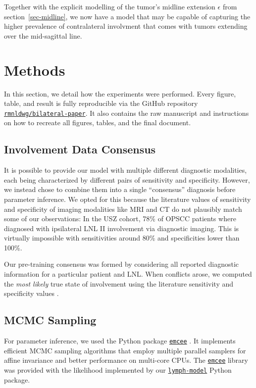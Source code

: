 \documentclass[
  sn-mathphys-num,
]{sn-jnl}
\begin{document}
Together with the explicit modelling of the tumor's midline extension
\(\epsilon\) from section~\ref{sec-midline}, we now have a model that
may be capable of capturing the higher prevalence of contralateral
involvment that comes with tumors extending over the mid-sagittal line.

\section{Methods}\label{sec-methods}

In this section, we detail how the experiments were performed. Every
figure, table, and result is fully reproducible via the GitHub
repository
\href{https://github.com/rmnldwg/bilateral-paper}{\texttt{rmnldwg/bilateral-paper}}.
It also contains the raw manuscript and instructions on how to recreate
all figures, tables, and the final document.

\subsection{Involvement Data
Consensus}\label{involvement-data-consensus}

It is possible to provide our model with multiple different diagnostic
modalities, each being characterized by different pairs of sensitivity
and specificity. However, we instead chose to combine them into a single
``consensus'' diagnosis before parameter inference. We opted for this
because the literature values of sensitivity and specificity
\citep{debondt_detection_2007} of imaging modalities like MRI and CT do
not plausibly match some of our observations: In the USZ cohort, 78\% of
OPSCC patients where diagnosed with ipsilateral LNL II involvement via
diagnostic imaging. This is virtually impossible with sensitivities
around 80\% and specificities lower than 100\%.

Our pre-training consensus was formed by considering all reported
diagnostic information for a particular patient and LNL. When conflicts
arose, we computed the \emph{most likely} true state of involvement
using the literature sensitivity and specificity values
\citep{debondt_detection_2007}.

\subsection{MCMC Sampling}\label{sec-sampling}

For parameter inference, we used the Python package
\href{https://emcee.readthedocs.io/en/stable/}{\texttt{emcee}}
\citep{foreman-mackey_emcee_2013}. It implements efficient MCMC sampling
algorithms that employ multiple parallel samplers for affine invariance
and better performance on multi-core CPUs. The
\href{https://emcee.readthedocs.io/en/stable/}{\texttt{emcee}} library
was provided with the likelihood implemented by our
\href{https://lymph-model.readthedocs.io/en/stable/}{\texttt{lymph-model}}
Python package.
\end{document}
